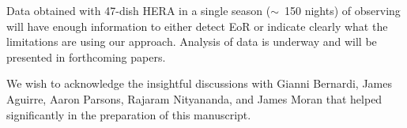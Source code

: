 \documentclass[
reprint,
superscriptaddress,
amsmath,
amssymb,
aps,
prd
]{revtex4-1}
\begin{document}
Data obtained with 47-dish HERA in a single season ($\sim$~150 nights) of observing will have enough information to either detect EoR or indicate clearly what the limitations are using our approach. Analysis of data is underway and will be presented in forthcoming papers.

\begin{acknowledgments}
We wish to acknowledge the insightful discussions with Gianni Bernardi, James Aguirre, Aaron Parsons, Rajaram Nityananda, and James Moran that helped significantly in the preparation of this manuscript.
\end{acknowledgments}





\end{document}
